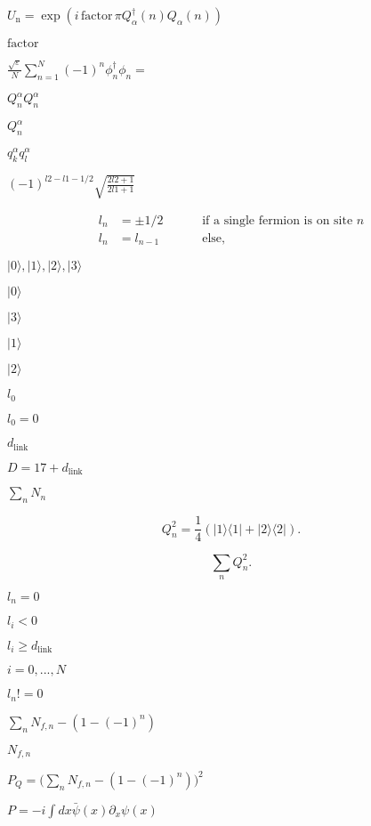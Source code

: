 \documentclass{article}
\begin{document}
{$ U_\mathrm{n}=\exp\left(i\,\mathrm{factor}\,\pi Q^\dagger_\alpha(n)Q_\alpha(n)\right) $
\pagebreak

$ \mathrm{factor} $
\pagebreak

$ \frac{\sqrt{\varepsilon}}{N}\sum_{n=1}^N (-1)^n\phi^\dagger_n\phi_n =  $
\pagebreak

$ Q^{\alpha}_n Q^{\alpha}_n $
\pagebreak

$ Q^{\alpha}_n$
\pagebreak

$ q^{\alpha}_kq^{\alpha}_l $
\pagebreak

$ (-1)^{l2-l1-1/2}\sqrt{\frac{2l2+1}{2l1+1}} $
\pagebreak

\begin{eqnarray*}
l_n &= \pm 1/2 \quad\quad  &\mbox{ if a single fermion is on site } n \\
l_n &= l_{n-1}  \quad\quad &\mbox{ else, } 
\end{eqnarray*}
\pagebreak

$ |0\rangle, |1\rangle, |2\rangle, |3\rangle $
\pagebreak

$ |0\rangle $
\pagebreak

$|3\rangle $
\pagebreak

$ |1\rangle $
\pagebreak

$|2\rangle $
\pagebreak

$ l_0 $
\pagebreak

$ l_0=0 $
\pagebreak

$ d_\mathrm{link}$
\pagebreak

$ D=17+d_\mathrm{link} $
\pagebreak

$ \sum_n N_n $
\pagebreak

\[ Q^2_n = \frac{1}{4} \left(|1\rangle\langle 1| + |2\rangle\langle 2|\right).\]
\pagebreak

\[ \sum_n Q^2_n .\]
\pagebreak

$ l_n=0 $
\pagebreak

$ l_i<0 $
\pagebreak

$ l_i\geq d_\mathrm{link}$
\pagebreak

$ i=0,...,N $
\pagebreak

$ l_n!=0 $
\pagebreak

$ \sum_n N_{f,n} - \left(1-(-1)^n\right) $
\pagebreak

$ N_{f,n} $
\pagebreak

$ P_Q= \bigl(\sum_n N_{f,n} - \left(1-(-1)^n\right) \bigr)^2 $
\pagebreak

$ P=-i\int dx \bar{\psi}(x)\partial_x\psi(x) $
\pagebreak

}
\end{document}
